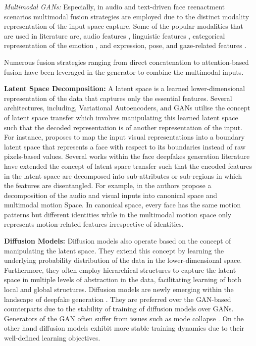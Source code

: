 
\textit{Multimodal GANs:} Especially, in audio and text-driven face reenactment scenarios multimodal fusion strategies are employed due to the distinct modality representation of the input space capture. Some of the popular modalities that are used in literature are, audio features \cite{yu2020multimodal,agarwal2023audio}, linguistic features \cite{yu2020multimodal, fan2022faceformer}, categorical representation of the emotion \cite{goyal2023emotionally}, and expression, pose, and gaze-related features \cite{agarwal2023audio}. 

Numerous fusion strategies ranging from direct concatenation \cite{goyal2023emotionally} to attention-based fusion \cite{yu2020multimodal} have been leveraged in the generator to combine the multimodal inputs.


\textbf{Latent Space Decomposition:} A latent space is a learned lower-dimensional representation of the data that captures only the essential features. Several architectures, including, Variational Autoencoders, and GANs utilise the concept of latent space transfer which involves manipulating this learned latent space such that the decoded representation is of another representation of the input. For instance, \cite{wu2018reenactgan} proposes to map the input visual representations into a boundary latent space that represents a face with respect to its boundaries instead of raw pixels-based values. Several works \cite{wang2021one,jang2023s} within the face deepfakes generation literature have extended the concept of latent space transfer such that the encoded features in the latent space are decomposed into sub-attributes or sub-regions in which the features are disentangled. 
For example, in \cite{jang2023s} the authors propose a decomposition of the audio and visual inputs into canonical space and multimodal motion Space. In canonical space, every face has the same motion patterns but different identities while in the multimodal motion space only represents motion-related features irrespective of identities. 

\textbf{Diffusion Models:} Diffusion models also operate based on the concept of manipulating the latent space. They extend this concept by learning the underlying probability distribution of the data in the lower-dimensional space. Furthermore, they often employ hierarchical structures to capture the latent space in multiple levels of abstraction in the data, facilitating learning of both local and global structures. Diffusion models are newly emerging within the landscape of deepfake generation \cite{chen2023text, xu2023multimodal, wang2022diffusion}. They are preferred over the GAN-based counterparts due to the stability of training of diffusion models over GANs. Generators of the GAN often suffer from issues such as mode collapse \cite{xu2023multimodal}. On the other hand diffusion models exhibit more stable training dynamics due to their well-defined learning objectives.

